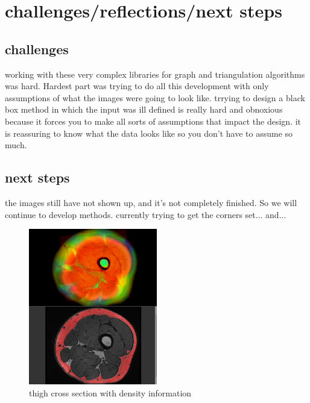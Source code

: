 \documentclass[letterpaper, 12 pt, conference]{ieeeconf}  %
\begin{document}
\section{challenges/reflections/next steps}
\subsection{challenges}
working with these very complex libraries for graph and triangulation algorithms was hard.  Hardest part was trying to do all this development with only assumptions of what the images were going to look like.  trrying to design a black box method in which the input was ill defined is really hard and obnoxious because it forces you to make all sorts of assumptions that impact the design.  it is reassuring to know what the data looks like so you don't have to assume so much.  
\subsection{next steps}
the images still have not shown up, and it's not completely finished.  So we will continue to develop methods.  currently trying to get the corners set... and... 





\begin{figure}[h!]
  \caption{thigh cross section with density information}
  \centering
    \includegraphics[width=0.5\textwidth]{images/thigh_slice.png}
    
      \label{fig:thigh_slice}

\end{figure}
\end{document}
